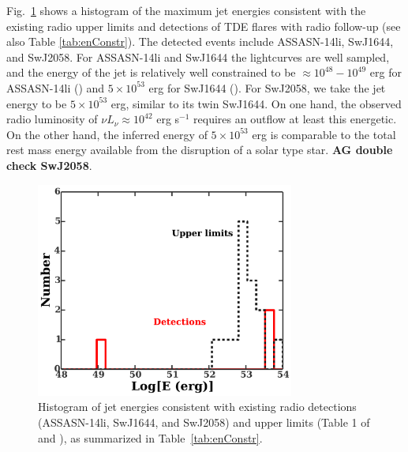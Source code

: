 \documentclass[usenatbib,fleqn]{mnras}
\begin{document}
Fig.~\ref{fig:hist} shows a histogram of the maximum jet energies
consistent with the existing radio upper limits and detections of TDE
flares with radio follow-up (see also Table \ref{tab:enConstr}).  The
detected events include ASSASN-14li,  SwJ1644, and SwJ2058.
For ASSASN-14li and SwJ1644 the lightcurves are well sampled, and the
energy of the jet is relatively well constrained to be $\approx
10^{48}-10^{49}$ erg for ASSASN-14li (\citealt{van-Velzen+2015,
  Alexander+2015}) and $5\times 10^{53}$ erg for SwJ1644
(\citealt{Mimica+2015}). 
For SwJ2058, we take the jet
energy to be $5\times 10^{53}$ erg, similar to its twin SwJ1644.  On
one hand, the observed radio luminosity of $\nu L_{\nu }\approx
10^{42}$ erg s$^{-1}$ \citep{Cenko+2012} requires an outflow at least
this energetic.  On the other hand, the inferred energy of $5\times
10^{53}$ erg is comparable to the total rest mass energy available
from the disruption of a solar type star. {\bf AG double check
  SwJ2058}.

\begin{figure}
\includegraphics[width=8.5cm]{hist.pdf}
\caption{\label{fig:hist} Histogram of jet energies consistent with
  existing radio detections (ASSASN-14li,  SwJ1644, and
  SwJ2058) and upper limits (Table 1 of \citealt{Mimica+2015} and
  \citealt{Arcavi+2014}), as summarized in Table~\ref{tab:enConstr}.}
\end{figure}
\end{document}
